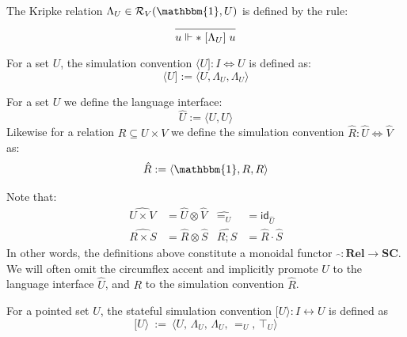 \documentclass[acmsmall,screen,review,anonymous]{acmart}
\newcommand{\kw}[1]{\ensuremath{ \mathsf{#1} }}
\newcommand{\ifr}[1]{\mathrel{[{#1}]}}
\newcommand{\caller}[1]{\langle #1 ]}
\newcommand{\callee}[1]{[ #1 \rangle}
\begin{document}
The Kripke relation
$\Lambda_U \in \mathcal{R}_V(\mathbbm{1}, U)$
is defined by the rule:
\[
  \begin{prooftree}
    \infer0{u \Vdash * \ifr{\Lambda_U} u}
  \end{prooftree}
\]

\begin{definition}
For a set $U$,
the simulation convention $\caller{U} : I \Leftrightarrow U$
is defined as:
\[
  \caller{U} := \big\langle U,
      \Lambda_U,
      \Lambda_U
    \big\rangle
\]
\end{definition}

\begin{definition}
For a set $U$ we define the language interface:
\[
  \hat{U} := \langle U, U \rangle
\]
Likewise for a relation $R \subseteq U \times V$
we define the simulation convention
$\hat{R} : \hat{U} \Leftrightarrow \hat{V}$ as:
\[
  \hat{R} := \langle \mathbbm{1}, R, R \rangle
\]
\end{definition}
Note that:
\begin{align*}
  \widehat{U \times V} &= \hat{U} \otimes \hat{V} &
  \widehat{{=}_U} &= \kw{id}_{\hat{U}} \\
  \widehat{R \times S} &= \hat{R} \otimes \hat{S} &
  \widehat{R \mathbin; S} &= \hat{R} \cdot \hat{S}
\end{align*}
In other words,
the definitions above constitute
a monoidal functor
$\hat{\:\:} : \mathbf{Rel} \rightarrow \mathbf{SC}$.
We will often omit the circumflex accent
and implicitly promote
$U$ to the language interface $\hat{U}$, and
$R$ to the simulation convention $\hat{R}$.

\begin{definition}
For a pointed set $U$,
the stateful simulation convention
$\callee{U} : I \leftrightarrow U$
is defined as
\[
  \callee U \: := \: \big\langle
      U, \,
      \Lambda_U, \,
      \Lambda_U, \,
      {=}_U, \,
      \top_U
    \big\rangle
\]
\end{definition}
\end{document}
